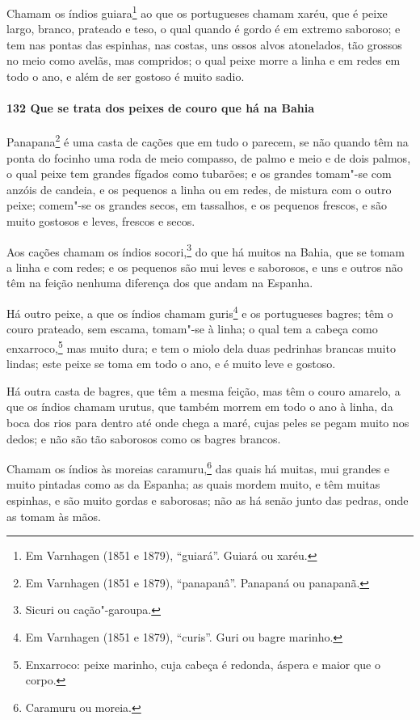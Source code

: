 Chamam os índios guiara\footnote{ Em Varnhagen (1851 e 1879), ``guiará''. Guiará ou
xaréu.} ao que os portugueses chamam xaréu, que é peixe largo, branco, prateado e teso, o
qual quando é gordo é em extremo saboroso; e tem nas pontas das espinhas, nas costas, uns
ossos alvos atonelados, tão grossos no meio como avelãs, mas compridos; o qual peixe morre
a linha e em redes em todo o ano, e além de ser gostoso é muito sadio.

\paragraph{132 Que se trata dos peixes de couro que há na Bahia}

Panapana\footnote{ Em Varnhagen (1851 e 1879), ``panapanâ''. Panapaná ou panapanã.} é uma
casta de cações que em tudo o parecem, se não quando têm na ponta do focinho uma roda de
meio compasso, de palmo e meio e de dois palmos, o qual peixe tem grandes fígados como
tubarões; e os grandes tomam"-se com anzóis de candeia, e os pequenos a linha ou em redes,
de mistura com o outro peixe; comem"-se os grandes secos, em tassalhos, e os pequenos
frescos, e são muito gostosos e leves, frescos e secos.

Aos cações chamam os índios socori,\footnote{ Sicuri ou cação"-garoupa.} do que há muitos
na Bahia, que se tomam a linha e com redes; e os pequenos são mui leves e saborosos, e uns
e outros não têm na feição nenhuma diferença dos que andam na Espanha.

Há outro peixe, a que os índios chamam guris\footnote{ Em Varnhagen (1851 e 1879),
``curis''. Guri ou bagre marinho.} e os portugueses bagres; têm o couro prateado, sem
escama, tomam"-se à linha; o qual tem a cabeça como enxarroco,\footnote{ Enxarroco: peixe
marinho, cuja cabeça é redonda, áspera e maior que o corpo.} mas muito dura; e tem o
miolo dela duas pedrinhas brancas muito lindas; este peixe se toma em todo o ano, e é
muito leve e gostoso.

Há outra casta de bagres, que têm a mesma feição, mas têm o couro amarelo, a que os índios
chamam urutus, que também morrem em todo o ano à linha, da boca dos rios para dentro até
onde chega a maré, cujas peles se pegam muito nos dedos; e não são tão saborosos como os
bagres brancos.

Chamam os índios às moreias caramuru,\footnote{ Caramuru ou moreia.} das quais há muitas,
mui grandes e muito pintadas como as da Espanha; as quais mordem muito, e têm muitas
espinhas, e são muito gordas e saborosas; não as há senão junto das pedras, onde as tomam
às mãos.

